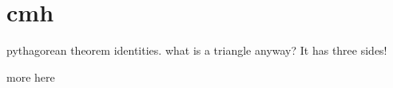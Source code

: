 \section{cmh}
pythagorean theorem identities.
what is a triangle anyway?
It has three sides!

more here
